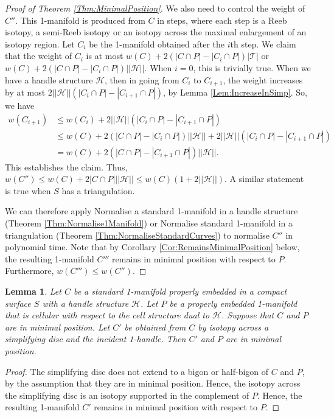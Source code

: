 \documentclass[oneside]{amsart}
\numberwithin{equation}{section}
\theoremstyle{plain}
\newtheorem{lemma}[equation]{Lemma}
\theoremstyle{definition}
\newcommand{\calT}{{\mathcal{T}}}
\newcommand{\calH}{\mathcal{H}}
\begin{document}
\begin{proof}[Proof of Theorem \ref{Thm:MinimalPosition}]
We also need to control the weight of $C''$. This 1-manifold is produced from $C$ in steps, where each step is a Reeb isotopy, a semi-Reeb isotopy or an isotopy across the maximal enlargement of an isotopy region. Let $C_i$ be the 1-manifold obtained after the $i$th step. We claim that the weight of $C_i$ is at most $w(C) + 2(|C \cap P| - |C_i \cap P|)|\calT|$ or $w(C) + 2(|C \cap P| - |C_i \cap P|)||\calH||$. When $i = 0$, this is trivially true. When we have a handle structure $\calH$, then in going from $C_i$ to $C_{i+1}$, the weight increases by at most $2 ||\calH||(|C_i \cap P| - |C_{i+1} \cap P|)$, by Lemma \ref{Lem:IncreaseInSimp}. So, we have
\begin{align*}
w(C_{i+1}) &\leq w(C_i) + 2 ||\calH||(|C_i \cap P| - |C_{i+1} \cap P|) \\
&\leq w(C) + 2(|C \cap P| - |C_i \cap P|)||\calH|| + 2 ||\calH||(|C_i \cap P| - |C_{i+1} \cap P|) \\
&= w(C) + 2(|C \cap P| - |C_{i+1} \cap P|)||\calH||.
\end{align*}
This establishes the claim. Thus, $w(C'') \leq w(C) + 2|C \cap P| ||\calH|| \leq w(C)(1 + 2||\calH||)$. A similar statement is true when $S$ has a triangulation.

We can therefore apply {\sc Normalise a standard 1-manifold in a handle structure} (Theorem \ref{Thm:Normalise1Manifold}) or {\sc Normalise standard 1-manifold in a triangulation} (Theorem \ref{Thm:NormaliseStandardCurves}) to normalise $C''$ in polynomial time. Note that by Corollary \ref{Cor:RemainsMinimalPosition} below, the resulting 1-manifold $C'''$ remains in minimal position with respect to $P$. Furthermore, $w(C''') \leq w(C'')$.
\end{proof}

\begin{lemma}
\label{Lem:StaysMinimal}
Let $C$ be a standard 1-manifold properly embedded in a compact surface $S$ with a handle structure $\calH$. Let $P$ be a properly embedded 1-manifold that is cellular with respect to the cell structure dual to $\calH$. Suppose that $C$ and $P$ are in minimal position.
Let $C'$ be obtained from $C$ by isotopy across a simplifying disc and the incident 1-handle. Then $C'$ and $P$ are in minimal position.
\end{lemma}

\begin{proof}
The simplifying disc does not extend to a bigon or half-bigon of $C$ and $P$, by the assumption that they are in minimal position. Hence, the isotopy across the simplifying disc is an isotopy supported in the complement of $P$. Hence, the resulting 1-manifold $C'$ remains in minimal position with respect to $P$.
\end{proof}
\end{document}
